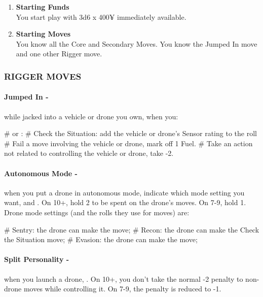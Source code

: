 \begin{enumerate}
    \item \textbf{Starting Funds} \\
    You start play with 3d6 x 400¥ immediately available.
    
    \item \textbf{Starting Moves} \\
    You know all the Core and Secondary Moves. You know the Jumped In move and one other Rigger move.
\end{enumerate}

\subsubsection{RIGGER MOVES}
\paragraph{Jumped In -} while jacked into a vehicle or drone you own, when you:
    \begin{easylist}
        #  or : 
        # Check the Situation: add the vehicle or drone’s Sensor rating to the roll
        # Fail a move involving the vehicle or drone, mark off 1 Fuel.
        # Take an action not related to controlling the vehicle or drone, take -2.
    \end{easylist}

\paragraph{Autonomous Mode -} when you put a drone in autonomous mode, indicate which mode setting you want, and . On 10+, hold 2 to be spent on the drone’s moves. On 7-9, hold 1. Drone mode settings (and the rolls they use for moves) are:
    \begin{easylist}
        # Sentry: the drone can make the  move; 
        # Recon: the drone can make the Check the Situation move; 
        # Evasion: the drone can make the  move; 
    \end{easylist}

\paragraph{Split Personality -} when you launch a drone, . On 10+, you don’t take the normal -2 penalty to non-drone moves while controlling it. On 7-9, the penalty is reduced to -1.

